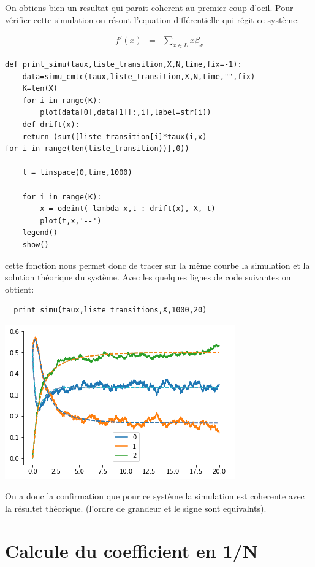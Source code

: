 \documentclass[a4paper]{article}
\begin{document}
On obtiens bien un resultat qui parait coherent au premier coup
d'oeil. Pour vérifier cette simulation on résout l'equation
différentielle qui régit ce système:

\begin{eqnarray*}
  f'(x) &=& \sum_{x \in L}x\beta_x
\end{eqnarray*}

\begin{lstlisting}[frame=single]
  def print_simu(taux,liste_transition,X,N,time,fix=-1):
    data=simu_cmtc(taux,liste_transition,X,N,time,"",fix)
    K=len(X)
    for i in range(K):
        plot(data[0],data[1][:,i],label=str(i))
    def drift(x):
    return (sum([liste_transition[i]*taux(i,x)
for i in range(len(liste_transition))],0))
    
    t = linspace(0,time,1000)

    for i in range(K):
        x = odeint( lambda x,t : drift(x), X, t)
        plot(t,x,'--')
    legend()
    show()
  \end{lstlisting}

cette fonction nous permet donc de tracer sur la même courbe la
simulation et la solution théorique du système.
Avec les quelques lignes de code suivantes on obtient:

\begin{lstlisting}
  print_simu(taux,liste_transitions,X,1000,20)
\end{lstlisting}
\includegraphics{figure2.png}

On a donc la confirmation que pour ce système la simulation est
coherente avec la résultet théorique. (l'ordre de grandeur et le signe
sont equivalnts).

\section{Calcule du coefficient en 1/N}
\end{document}

